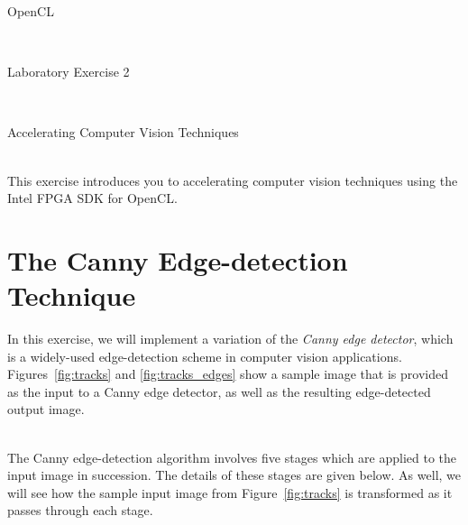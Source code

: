 \documentclass[epsfig,10pt,fullpage]{article}
\newcommand{\LabNum}{2}
\begin{document}
\centerline{\huge OpenCL}
~\\
\centerline{\huge Laboratory Exercise \LabNum}
~\\
\centerline{\large Accelerating Computer Vision Techniques}
~\\

This exercise introduces you to accelerating computer vision techniques using the Intel FPGA SDK for OpenCL. 

\section*{The Canny Edge-detection Technique}

\noindent
In this exercise, we will implement a variation of the \textit{Canny edge detector}, which is 
a widely-used edge-detection scheme in computer vision applications. Figures~\ref{fig:tracks} and \ref{fig:tracks_edges} 
show a sample image that is provided as the input to a Canny edge detector, as well as the 
resulting edge-detected output image. 

~\\
\noindent
The Canny edge-detection algorithm involves five stages which are applied to the input image in 
succession. The details of these stages are given below. As well, we will see how the sample 
input image from Figure~\ref{fig:tracks} is transformed as it passes through 
each stage.
\end{document}
